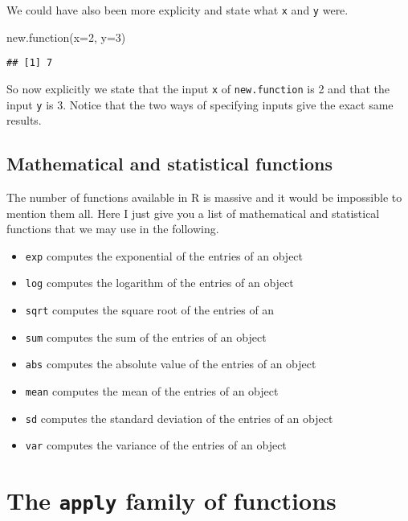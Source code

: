 \documentclass[
]{book}
\newenvironment{Shaded}{\begin{snugshade}}{\end{snugshade}}
\newcommand{\AttributeTok}[1]{\textcolor[rgb]{0.77,0.63,0.00}{#1}}
\newcommand{\DecValTok}[1]{\textcolor[rgb]{0.00,0.00,0.81}{#1}}
\newcommand{\FunctionTok}[1]{\textcolor[rgb]{0.00,0.00,0.00}{#1}}
\newcommand{\NormalTok}[1]{#1}
\begin{document}
We could have also been more explicity and state what \texttt{x} and \texttt{y} were.

\begin{Shaded}
\begin{Highlighting}[]
\FunctionTok{new.function}\NormalTok{(}\AttributeTok{x=}\DecValTok{2}\NormalTok{, }\AttributeTok{y=}\DecValTok{3}\NormalTok{)}
\end{Highlighting}
\end{Shaded}

\begin{verbatim}
## [1] 7
\end{verbatim}

So now explicitly we state that the input \texttt{x} of \texttt{new.function} is 2 and that the input \texttt{y} is 3. Notice that the two ways of specifying inputs give the exact same results.

\hypertarget{mathematical-and-statistical-functions}{%
\subsection{Mathematical and statistical functions}\label{mathematical-and-statistical-functions}}

The number of functions available in R is massive and it would be impossible to mention them all. Here I just give you a list of mathematical and statistical functions that we may use in the following.

\begin{itemize}
\item
  \texttt{exp} computes the exponential of the entries of an object
\item
  \texttt{log} computes the logarithm of the entries of an object
\item
  \texttt{sqrt} computes the square root of the entries of an
\item
  \texttt{sum} computes the sum of the entries of an object
\item
  \texttt{abs} computes the absolute value of the entries of an object
\item
  \texttt{mean} computes the mean of the entries of an object
\item
  \texttt{sd} computes the standard deviation of the entries of an object
\item
  \texttt{var} computes the variance of the entries of an object
\end{itemize}

\hypertarget{the-apply-family-of-functions}{%
\section{\texorpdfstring{The \texttt{apply} family of functions}{The apply family of functions}}\label{the-apply-family-of-functions}}
\end{document}
